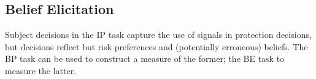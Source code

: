 \documentclass[12pt,a4paper]{article}
\begin{document}

\begin{table}[H]\centering 
\caption{Average Protection by Signal Type} 
\label{tab:nonparIP}
\end{table}



\subsection{Belief Elicitation}
Subject decisions in the IP task capture the use of signals in protection decisions, but decisions reflect but risk preferences and (potentially erroneous) beliefs.  The BP task can be used to construct a measure of the former; the BE task to measure the latter.  


\end{document}
